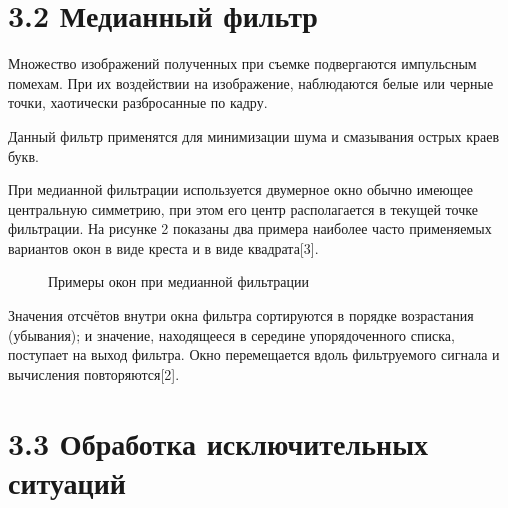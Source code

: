 \documentclass[14pt,a4paper]{extreport}
\begin{document}
                  \section*{\normalsize\hspace{4ex} 3.2 Медианный фильтр}

   \hspace{4ex} Множество изображений полученных при съемке подвергаются импульсным помехам. При их воздействии на изображение, наблюдаются белые или черные точки, хаотически разбросанные по кадру.\
   
   \hspace{4ex} Данный фильтр применятся для минимизации шума и смазывания острых краев букв.\
   
   \hspace{4ex} При медианной фильтрации используется двумерное окно обычно имеющее центральную симметрию, при этом его центр располагается в текущей точке фильтрации. На рисунке 2 показаны два примера наиболее часто применяемых вариантов окон в виде креста и в виде квадрата[3].\

\begin{figure}[h!]
\caption{Примеры окон при медианной фильтрации}
\end{figure}

   \hspace{4ex}Значения отсчётов внутри окна фильтра сортируются в порядке возрастания (убывания); и значение, находящееся в середине упорядоченного списка, поступает на выход фильтра. Окно перемещается вдоль фильтруемого сигнала и вычисления повторяются[2].\
  

                  \section*{\normalsize\hspace{4ex}3.3 Обработка исключительных ситуаций}
\end{document}
